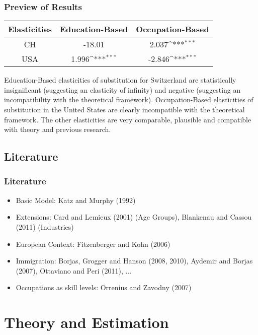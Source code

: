 \documentclass[11pt]{beamer} \usetheme{Frankfurt}
\def\sym#1{\ifmmode^{#1}\else\(^{#1}\)\fi}
\begin{document}
\begin{frame}
  \frametitle{Preview of Results}
  \begin{table}[htbp]
    \centering
    \begin{tabular}{ccc}
      \toprule
      \multicolumn{1}{l}{Elasticities} & \multicolumn{1}{l}{Education-Based}
      & \multicolumn{1}{l}{Occupation-Based} \\
      \midrule
      CH    &  -18.01   & 2.037\sym{***} \\
      USA   & 1.996\sym{***}  & -2.846\sym{***} \\
      \bottomrule
    \end{tabular}%
  \end{table}%
  Education-Based elasticities of substitution for Switzerland are
  statistically insignificant (suggesting an elasticity of infinity)
  and negative (suggesting an incompatibility with the theoretical
  framework). Occupation-Based elasticities of substitution in the
  United States are clearly incompatible with the theoretical
  framework. The other elasticities are very comparable, plausible and
  compatible with theory and previous research.
\end{frame}
  
\subsection{Literature}
\begin{frame}
  \frametitle{Literature}
  \begin{itemize}
  \item Basic Model: Katz and Murphy (1992)
  \item Extensions: Card and Lemieux (2001) (Age Groups), Blankenau
    and Cassou (2011) (Industries)
  \item European Context: Fitzenberger and Kohn (2006)
  \item Immigration: Borjas, Grogger and Hanson (2008, 2010), Aydemir
    and Borjas (2007), Ottaviano and Peri (2011), ...
  \item Occupations as skill levels: Orrenius and Zavodny (2007)
  \end{itemize}
\end{frame}
\section{Theory and Estimation}
\end{document}
